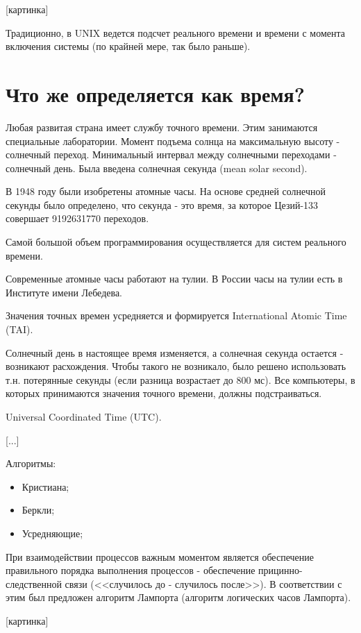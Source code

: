 \documentclass[a4paper, 12pt]{report}
\begin{document}
	[картинка]
	
	Традиционно, в UNIX ведется подсчет реального времени и времени с момента включения системы (по крайней мере, так было раньше).
	
	\section*{Что же определяется как время?}
	
	Любая развитая страна имеет службу точного времени. Этим занимаются специальные лаборатории. Момент подъема солнца на максимальную высоту - солнечный переход. Минимальный интервал между солнечными переходами - солнечный день. Была введена солнечная секунда (mean solar second).
	
	В 1948 году были изобретены атомные часы. На основе средней солнечной секунды было определено, что секунда - это время, за которое Цезий-133 совершает 9192631770 переходов.
	
	Самой большой объем программирования осуществляется для систем реального времени.
	
	Современные атомные часы работают на тулии. В России часы на тулии есть в Институте имени Лебедева.
	
	Значения точных времен усредняется и формируется International Atomic Time (TAI).
	
	Солнечный день в настоящее время изменяется, а солнечная секунда остается - возникают расхождения. Чтобы такого не возникало, было решено использовать т.н. потерянные секунды (если разница возрастает до 800 мс). Все компьютеры, в которых принимаются значения точного времени, должны подстраиваться.
	
	Universal Coordinated Time (UTC).
	
	[...]
	
	Алгоритмы:
	
	\begin{itemize}
		\item Кристиана;
		\item Беркли;
		\item Усредняющие;
	\end{itemize}

	При взаимодействии процессов важным моментом является обеспечение правильного порядка выполнения процессов - обеспечение прицинно-следственной связи (<<случилось до - случилось после>>). В соответствии с этим был предложен алгоритм Лампорта (алгоритм логических часов Лампорта).
	
	[картинка]
	
\end{document}
